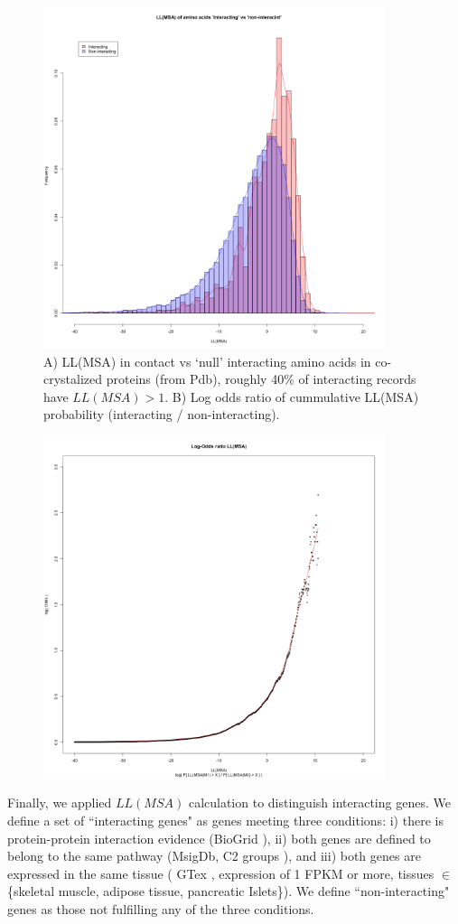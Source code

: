 \begin{figure}
    \centering
    \includegraphics[width=10cm]{gwas_figure_3A.png}
	\caption{A) LL(MSA) in contact vs ‘null’ interacting amino acids in co-crystalized proteins (from Pdb), roughly 40\% of interacting records have $LL(MSA) > 1$. B) Log odds ratio of cummulative LL(MSA) probability (interacting / non-interacting).}
    \label{fig:gwasf3a}
\end{figure}
\begin{figure}
    \centering
    \includegraphics[width=10cm]{gwas_figure_3B.png}
    \label{fig:gwasf3b}
\end{figure}

Finally, we applied $LL(MSA)$ calculation to distinguish interacting genes. We define a set of ``interacting genes" as genes meeting three conditions: i) there is protein-protein interaction evidence (BioGrid \cite{stark2006biogrid}), ii) both genes are defined to belong to the same pathway (MsigDb, C2 groups \cite{subramanian2005gene}), and iii) both genes are expressed in the same tissue ( GTex \cite{lonsdale2013genotype}, expression of 1 FPKM or more, tissues $\in$ \{skeletal muscle, adipose tissue, pancreatic Islets\}). We define ``non-interacting" genes as those not fulfilling any of the three conditions.

